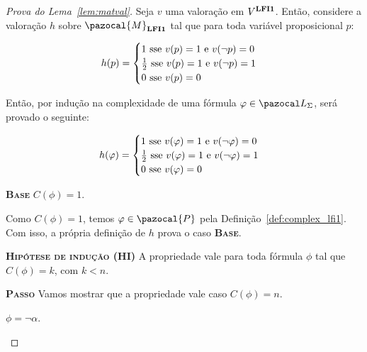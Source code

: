     \begin{proof}[Prova do Lema~\ref{lem:matval}]
        Seja $v$ uma valoração em $V^{{\normalfont\textbf{LFI1}}}$. Então, considere a valoração $h$ sobre $\pazocal{M}_{\lfium}$ tal que para toda variável proposicional $p$:
        \begin{center}
            \begin{equation*}
                h(p) =
                \begin{cases}
                  1 \text{ sse } v(p) = 1 \text{ e } v(\neg p) = 0 \\
                  \frac{1}{2}{} \text{ sse } v(p) = 1 \text{ e } v(\neg p) = 1 \\
                  0 \text{ sse } v(p) = 0
                \end{cases}
              \end{equation*}
        \end{center}

        Então, por indução na complexidade de uma fórmula $\phi \in \ling{}$, será provado o seguinte:
        \begin{center}
            \begin{equation*}
                h(\varphi) =
                \begin{cases}
                  1 \text{ sse } v(\varphi) = 1 \text{ e } v(\neg \varphi) = 0 \\
                  \frac{1}{2}{} \text{ sse } v(\varphi) = 1 \text{ e } v(\neg \varphi) = 1 \\
                  0 \text{ sse } v(\varphi) = 0
                \end{cases}
              \end{equation*}
        \end{center}

        \noindent \textbf{\textsc{Base}} $C(\phi) = 1$.

        Como $C(\phi) = 1$, temos $\phi \in \pazocal{P}$ pela Definição~\ref{def:complex_lfi1}. Com isso, a própria definição de $h$ prova o caso \textbf{\textsc{Base}}.

        \noindent \textbf{\textsc{Hipótese de indução (HI)}} 
        A propriedade vale para toda fórmula $\phi$ tal que $C(\phi) = k$, com $k < n$.

        \noindent \textbf{\textsc{Passo}} 
            Vamos mostrar que a propriedade vale caso $C(\phi) = n$.

        \begin{provaporcasos}
            \casodeprova{} $\phi = \neg \alpha$.
                

\end{provaporcasos}
\end{proof}
